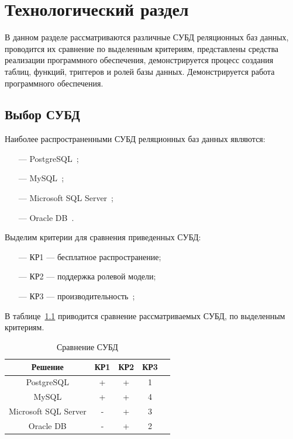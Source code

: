 \chapter{Технологический раздел}
В данном разделе рассматриваются различные СУБД реляционных баз данных, проводится их сравнение по выделенным критериям, представлены  средства реализации программного обеспечения, демонстрируется процесс создания таблиц, функций, триггеров и ролей базы данных. Демонстрируется работа программного обеспечения.

\section{Выбор СУБД}
Наиболее распространенными СУБД реляционных баз данных являются:
\begin{itemize}
    \item[---] PostgreSQL~\cite{Psql};
    \item[---] MySQL~\cite{MySQL};
    \item[---] Microsoft SQL Server~\cite{MSSQL};
    \item[---] Oracle DB~\cite{Oracle}.
\end{itemize}

Выделим критерии для сравнения приведенных СУБД:
\begin{itemize}
    \item[---] КР1 --- бесплатное распространение;
    \item[---] КР2 --- поддержка ролевой модели;
    \item[---] КР3 --- производительность~\cite{ismail2019oracle, solarz2020oracle};
\end{itemize}

В таблице~\ref{tbl:versus_subd} приводится сравнение рассматриваемых СУБД, по выделенным критериям.

\begin{table}[H]
    \begin{center}
        \caption{Сравнение СУБД}
        \begin{tabular}{|c|c|c|c|c|}
            \hline
            \textbf{Решение} & \textbf{КР1} & \textbf{КР2} & \textbf{КР3} \\
            \hline
            PostgreSQL & + & + & 1 \\
            \hline
            MySQL & + & + & 4 \\
            \hline
            Microsoft SQL Server & - & + & 3 \\
            \hline
            Oracle DB & - & + & 2 \\
            \hline
        \end{tabular}
        \label{tbl:versus_subd}
    \end{center}
\end{table}


